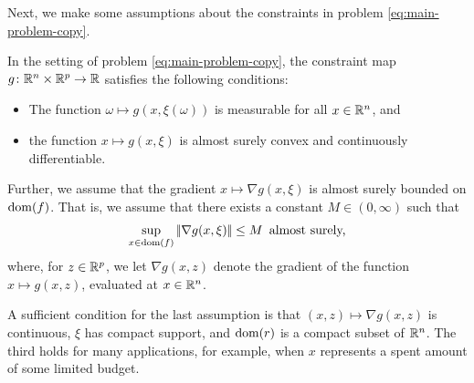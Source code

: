 Next, we make some assumptions about the constraints in problem \eqref{eq:main-problem-copy}.
\begin{assumption}
    \label{ass:constraints}
    In the setting of problem \eqref{eq:main-problem-copy}, the constraint map $g\colon\mathbb{R}^n\times\mathbb{R}^p\to\mathbb{R}$
    satisfies the following conditions:
    \begin{itemize}
        \item[-] The function $\omega\mapsto g(x, \xi(\omega))$ is measurable for all $x\in\mathbb{R}^n$, and
        \item[-] the function $x\mapsto g(x, \xi)$ is almost surely convex and continuously differentiable.
    \end{itemize}
    Further, we assume that the gradient $x\mapsto \nabla g(x, \xi)$ is almost surely bounded
    on $\operatorname{dom}(f)$. That is, we assume that there exists a constant $M\in(0,\infty)$ such that
    \[
        \sup_{x\in \operatorname{dom}(f)} |\!|\nabla g(x, \xi)|\!| \leq M \enspace\text{almost surely,}
    \]
    where, for $z\in\mathbb{R}^p$, we let $\nabla g(x, z)$ denote the gradient of the function $x\mapsto g(x, z)$,
    evaluated at $x\in\mathbb{R}^n$.
\end{assumption}
A sufficient condition for the last assumption is that
$(x, z) \mapsto \nabla g(x, z)$ is continuous, $\xi$ has compact support, and $\operatorname{dom}(r)$
is a compact subset of $\mathbb{R}^n$. The third
holds for many applications, for example, when $x$ represents a spent amount of some limited budget.

